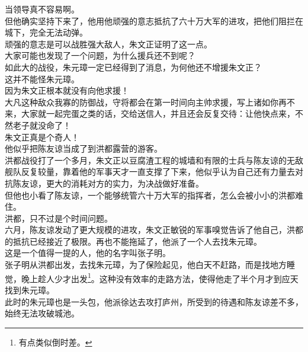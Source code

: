\begin{multicols}{\theparacolNo}
当领导真不容易啊。\\

但他确实坚持下来了，他用他顽强的意志抵抗了六十万大军的进攻，把他们阻拦在城下，完全无法动弹。\\

顽强的意志是可以战胜强大敌人，朱文正证明了这一点。\\

大家可能也发现了一个问题，为什么援兵还不到呢？\\

如此大的战役，朱元璋一定已经得到了消息，为何他还不增援朱文正？\\

这并不能怪朱元璋。\\

因为朱文正根本就没有向他求援！\\

大凡这种敌众我寡的防御战，守将都会在第一时间向主帅求援，写上诸如你再不来，大家就一起完蛋之类的话，交给送信人，并且还会反复交待：让他快点来，不然老子就没命了！\\

朱文正真是个奇人！\\

他似乎把陈友谅当成了到洪都露营的游客。\\

洪都战役打了一个多月，朱文正以豆腐渣工程的城墙和有限的士兵与陈友谅的无敌舰队反复较量，靠着他的军事天才一直支撑了下来，他似乎认为自己还有力量去对抗陈友谅，更大的消耗对方的实力，为决战做好准备。\\

但他也小看了陈友谅，一个能够统管六十万大军的指挥者，怎么会被小小的洪都难住。\\

洪都，只不过是个时间问题。\\

六月，陈友谅发动了更大规模的进攻，朱文正敏锐的军事嗅觉告诉了他自己，洪都的抵抗已经接近了极限。再也不能拖延了，他派了一个人去找朱元璋。\\

这是一个值得一提的人，他的名字叫张子明。\\

张子明从洪都出发，去找朱元璋，为了保险起见，他白天不赶路，而是找地方睡觉，晚上趁人少才出发\footnote{有点类似倒时差。}。这种没有效率的走路方法，使得他走了半个月才到应天找到朱元璋。\\

此时的朱元璋也是一头包，他派徐达去攻打庐州，所受到的待遇和陈友谅差不多，始终无法攻破城池。\\


\end{multicols}
